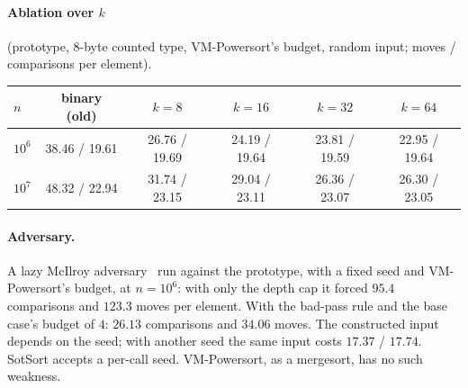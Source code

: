 \documentclass[11pt]{article}
\theoremstyle{remark}
\begin{document}
\paragraph{Ablation over $k$} (prototype, 8-byte counted type, VM-Powersort's budget,
random input; moves / comparisons per element).
\begin{center}
\begin{tabular}{lccccc}
\toprule
$n$ & binary (old) & $k=8$ & $k=16$ & $k=32$ & $k=64$\\
\midrule
$10^6$ & 38.46 / 19.61 & 26.76 / 19.69 & 24.19 / 19.64 & 23.81 / 19.59 & 22.95 / 19.64\\
$10^7$ & 48.32 / 22.94 & 31.74 / 23.15 & 29.04 / 23.11 & 26.36 / 23.07 & 26.30 / 23.05\\
\bottomrule
\end{tabular}
\end{center}

\paragraph{Adversary.}
A lazy McIlroy adversary~\cite{mcilroy} run against the prototype, with a fixed seed and
VM-Powersort's budget, at $n=10^6$: with only the depth cap it forced $95.4$
comparisons and $123.3$ moves per element. With the bad-pass rule and the base
case's budget of $4$: $26.13$ comparisons and $34.06$ moves. The constructed input
depends on the seed; with another seed the same input costs $17.37$ / $17.74$.
SotSort accepts a per-call seed. VM-Powersort, as a mergesort, has no such weakness.
\end{document}
